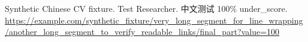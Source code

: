 \documentclass{article}
\begin{document}
Synthetic Chinese CV fixture. Test Researcher. 中文测试 100\% under\_score.
\url{https://example.com/synthetic_fixture/very_long_segment_for_line_wrapping/another_long_segment_to_verify_readable_links/final_part?value=100}
\end{document}
